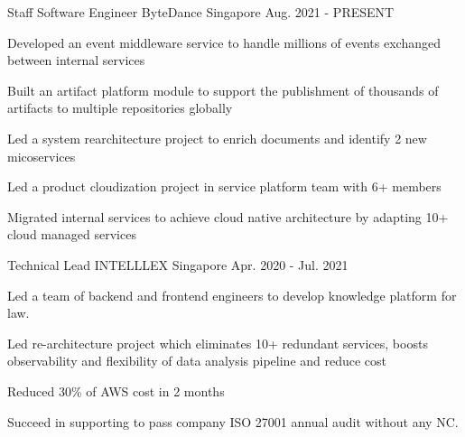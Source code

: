 

\begin{cventries}

  \cventry
    {Staff Software Engineer} %
    {ByteDance} %
    {Singapore} %
    {Aug. 2021 - PRESENT} %
    {
      \begin{cvitems} %
        \item {Developed an event middleware service to handle millions of events exchanged between internal services}
        \item {Built an artifact platform module to support the publishment of thousands of artifacts to multiple repositories globally}
        \item {Led a system rearchitecture project to enrich documents and identify 2 new micoservices}
        \item {Led a product cloudization project in service platform team with 6+ members}
				\item {Migrated internal services to achieve cloud native architecture by adapting 10+ cloud managed services}
      \end{cvitems}
    }

  \cventry
    {Technical Lead} %
    {INTELLLEX} %
    {Singapore} %
    {Apr. 2020 - Jul. 2021} %
    {
      \begin{cvitems} %
        \item {Led a team of backend and frontend engineers to develop knowledge platform for law.}
        \item {Led re-architecture project which eliminates 10+ redundant services, boosts observability
and flexibility of data analysis pipeline and reduce cost}
        \item {Reduced 30\% of AWS cost in 2 months}
        \item {Succeed in supporting to pass company ISO 27001 annual audit without any NC.}
      \end{cvitems}
    }


\end{cventries}
